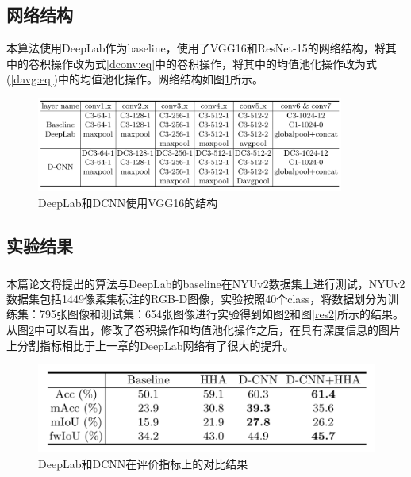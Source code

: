 \documentclass[cn]{elegantbook}
\newcommand{\upcite}[1]{\textsuperscript{\textsuperscript{\cite{#1}}}}
\begin{document}
\subsection{网络结构}
本算法使用DeepLab作为baseline，使用了VGG16和ResNet-15的网络结构，将其中的卷积操作改为式\ref{dconv:eq}中的卷积操作，将其中的均值池化操作改为式(\ref{davg:eq})中的均值池化操作。网络结构如图\ref{arch}所示。

\begin{figure}[h]
	\centering
	\includegraphics[width=0.9\textwidth]{images/arch.png}
	\caption{\label{arch}DeepLab和DCNN使用VGG16的结构}
\end{figure}

\subsection{实验结果}
本篇论文将提出的算法与DeepLab的baseline在NYUv2\upcite{silberman2012indoor}数据集上进行测试，NYUv2数据集包括1449像素集标注的RGB-D图像，实验按照40个class，将数据划分为训练集：795张图像和测试集：654张图像进行实验得到如图\ref{res1}和图\ref{res2}所示的结果。从图\ref{res1}中可以看出，修改了卷积操作和均值池化操作之后，在具有深度信息的图片上分割指标相比于上一章的DeepLab网络有了很大的提升。

\begin{figure}[h]
	\centering
	\includegraphics[width=\textwidth]{images/res1.png}
	\caption{\label{res1}DeepLab和DCNN在评价指标上的对比结果}
\end{figure}
\end{document}
